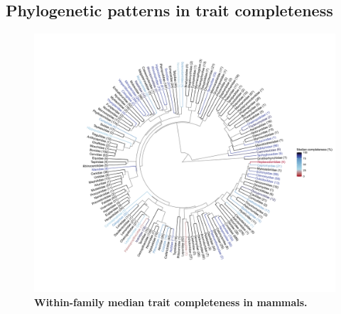 \begin{landscape}

\section{Phylogenetic patterns in trait completeness}


\begin{figure}[h!]
\centering
\includegraphics[scale=0.63, clip, trim=100 60 0 60]{Supporting/Chapter2/Figures/Phylogenies/Circular_mammals_V2}
\caption[Within-family median trait completeness in mammals]{\textbf{Within-family median trait completeness in mammals.}}
\label{SI2_phymammals}
\end{figure}

\newpage
\pagebreak
\vspace{-3cm}


\end{landscape}
